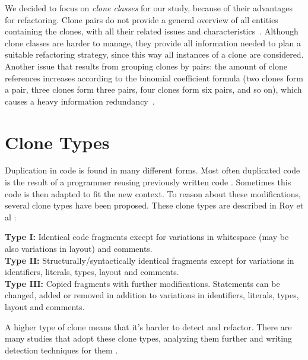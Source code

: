 We decided to focus on \textit{clone classes} for our study, because of their advantages for refactoring. Clone pairs do not provide a general overview of all entities containing the clones, with all their related issues and characteristics~\cite{fontana2012duplicated}. Although clone classes are harder to manage, they provide all information needed to plan a suitable refactoring strategy, since this way all instances of a clone are considered. Another issue that results from grouping clones by pairs: the amount of clone references increases according to the binomial coefficient formula (two clones form a pair, three clones form three pairs, four clones form six pairs, and so on), which causes a heavy information redundancy~\cite{fontana2012duplicated}.

\section{Clone Types} \label{chap:backgroundclonetypes}
Duplication in code is found in many different forms. Most often duplicated code is the result of a programmer reusing previously written code \cite{haefliger2008code, baxter1998clone}. Sometimes this code is then adapted to fit the new context. To reason about these modifications, several clone types have been proposed. These clone types are described in Roy et al \cite{roy2007survey}:
\begin{displayquote}
\textbf{Type I:} Identical code fragments except for variations in whitespace (may be also variations in layout) and comments.\\
\textbf{Type II:} Structurally/syntactically identical fragments except for variations in identifiers, literals, types, layout and comments.\\
\textbf{Type III:} Copied fragments with further modifications. Statements can be changed, added or removed in addition to variations in identifiers, literals, types, layout and comments.
\end{displayquote}
A higher type of clone means that it's harder to detect and refactor. There are many studies that adopt these clone types, analyzing them further and writing detection techniques for them \cite{sajnani2016sourcerercc, kodhai2010detection, van2019novel}.


